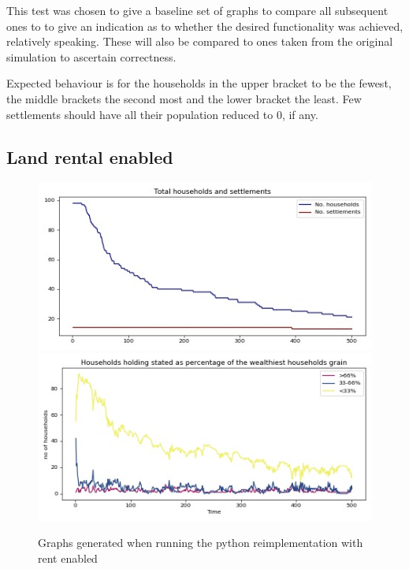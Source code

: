 \documentclass[12pt]{article}
\begin{document}
				This test was chosen to give a baseline set of graphs to compare all subsequent ones to to give an indication as to whether the desired functionality was achieved, relatively speaking. These will also be compared to ones taken from the original simulation to ascertain correctness.
			
				Expected behaviour is for the households in the upper bracket to be the fewest, the middle brackets the second most and the lower bracket the least. Few settlements should have all their population reduced to 0, if any. 
		
			\subsection{Land rental enabled}
					\begin{figure}[!htb]
					\includegraphics[width=12cm]{Land_rental_enabled_run1_A}\\
					\includegraphics[width=12cm]{Land_rental_enabled_run1_B}
					\caption{Graphs generated when running the python reimplementation with rent enabled}
					\label{fig:Land_rental_enabled_ours_1}
					\end{figure}
					
\end{document}
